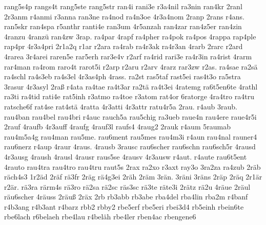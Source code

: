 {    rang5s4p
    rangs4t
    rang5ste
    rang5str
    ran4i
    rani3e
    r3a4nil
    ra3nin
    ran4kr
    2ranl
    2r3anm
    r4anmi
    r3anna
    ran3ne
    ra4nod
    ra4n3oe
    4r3a4nom
    2ranp
    2rans
    r4ans.
    ran5skr
    ran4spa
    r5anthr
    ranti4e
    ran3um
    4r5anzah
    ran4zar
    ran4z5er
    ran4zin
    4ranzu
    4ranzü
    ran4zw
    3rap.
    ra4par
    4rapf
    ra4pher
    ra4pok
    ra4pos
    4rappa
    rap4ple
    rap4pr
    4r3a4pri
    2r1a2q
    r1ar
    r2ara
    ra4rab
    ra4r3ak
    ra4r3an
    4rarb
    2rarc
    r2ard
    4rarea
    3r4arei
    raren5e
    rar5erh
    rar3e4v
    r2arf
    ra4rid
    rari3e
    ra4r3in
    ra4rist
    4rarm
    rar4man
    ra4rom
    raro4t
    rarot5i
    r2arp
    r2aru
    r2arv
    4rarz
    rar3zw
    r2as.
    ra4sae
    ra2sä
    ra4schl
    ra4s3eb
    ra4s3el
    4r3as4ph
    4rass.
    ra2st
    ras5taf
    rast5ei
    ras4t3o
    ra5stra
    3rasur
    4r3asyl
    2raß
    r4ata
    ra4tae
    ra4t3ar
    ra2tä
    ra4t3ei
    4ratemg
    ra6t5en6te
    4rathl
    ra3ti
    ra4tid
    rati4e
    rat5inh
    r3atmo
    ra4toe
    r3atom
    rat4or
    6ratorge
    4ra4tro
    ra4tru
    ratsche6f
    rat4se
    rat4stä
    4ratta
    4r3atti
    4r3attr
    ratu4r5a
    2rau.
    r4aub
    3raub.
    rau4ban
    rau4bel
    rau4bri
    r4auc
    rauch5a
    rau5chig
    ra3ueb
    raue4n
    rau4ere
    raue4r5i
    2rauf
    4raufb
    4r3auff
    4raufg
    4rauf3l
    raufs4
    4raug2
    2rauk
    r4aum
    5raumab
    rau4m5a4g
    rau4man
    rau5me.
    rau6ment
    rau5mes
    rau4m3i
    r4aun
    rau4nal
    rauner4
    rau6nerz
    r4aup
    4raur
    4raus.
    4rausb
    3rausc
    rau6scher
    rau6schn
    rau6sch5r
    4rausd
    4r3ausg
    4raush
    4rausl
    4rausr
    raus5se
    4rausv
    4r3ausw
    r4aut.
    r4aute
    rau6t5ent
    4rauto
    rau4tra
    rau4tro
    rau4tru
    raut5s
    2rax
    ra2xo
    r3axt
    ray3o
    3ra2za
    ra4zub
    2räb
    räch4s3
    1r2äd
    2räf
    rä3fr
    2räg
    rä4g3ei
    2räh
    2räm
    3rän.
    3räni
    3räns
    2räp
    2räq
    2r1är
    r2är.
    rä3ra
    rärm4s
    rä3ro
    rä2sa
    rä2sc
    räs3sc
    rä3te
    räte3i
    2rätz
    rä2u
    4räue
    2räul
    räu6scher
    4räuss
    2räuß
    2räx
    2rb
    rb3abb
    rb3abe
    rba4del
    rba4lin
    rba2m
    r4banf
    r4b3ang
    r4b3ant
    r4barz
    rbb2
    rbby2
    rbe5erf
    rbe5eri
    rbei3d4
    rb5einh
    rbein6te
    rbe6lach
    r6belaeh
    rbe4lau
    r4beläh
    rbe4ler
    rben4ac
    rbengene6
}
